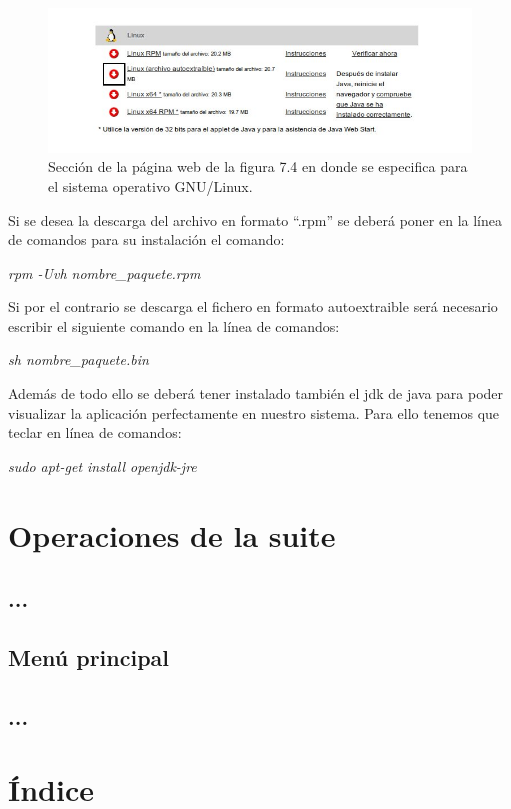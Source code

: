 \begin{figure}[H]
\includegraphics[width=15cm]{./imagenes_documentacion/captura_4.jpeg}
\caption{Sección de la página web de la figura 7.4 en donde se especifica para el sistema operativo GNU/Linux.}
\end{figure}

Si se desea la descarga del archivo en formato ``.rpm'' se deberá poner en la línea de comandos para su instalación el comando:\\

\begin{center} \emph{rpm -Uvh nombre\_paquete.rpm}\\ \end{center}

Si por el contrario se descarga el fichero en formato autoextraible será necesario escribir el siguiente comando en la línea de comandos:\\

\begin{center} \emph{sh nombre\_paquete.bin}\\ \end{center}

Además de todo ello se deberá tener instalado también el jdk de java para poder visualizar la aplicación perfectamente en nuestro sistema. Para ello tenemos que teclar en línea de comandos:\\
\begin{center} \emph{sudo apt-get install openjdk-jre} \\ \end{center}

\section{Operaciones de la suite}
\subsection{...}
\subsection{Menú principal}
\subsection{...}

\section{Índice}

